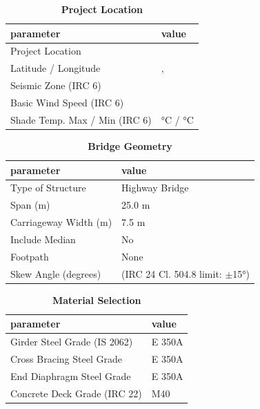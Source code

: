 \documentclass[12pt,a4paper]{report}
\numberwithin{table}{chapter}
\numberwithin{figure}{chapter}
\begin{document}
\begin{table}[H]
\caption{\textbf{Project Location}}
\label{subsec:project-location}
\begin{tabular}{|L{5.5cm}|L{8.5cm}|}
\hline
\textbf{parameter} & \textbf{value} \\
\hline
\textnormal{Project Location} &  \\
\hline
\textnormal{Latitude / Longitude} & ,  \\
\hline
\textnormal{Seismic Zone (IRC 6)} &  \\
\hline
\textnormal{Basic Wind Speed (IRC 6)} &  \\
\hline
\textnormal{Shade Temp. Max / Min (IRC 6)} &  °C /  °C \\
\hline
\end{tabular}
\vspace{0.4cm}
\end{table}

\begin{table}[H]
\caption{\textbf{Bridge Geometry}}
\label{subsec:bridge-geometry}
\begin{tabular}{|L{5.5cm}|L{8.5cm}|}
\hline
\textbf{parameter} & \textbf{value} \\
\hline
\textnormal{Type of Structure} & Highway Bridge \\
\hline
\textnormal{Span (m)} & 25.0 m \\
\hline
\textnormal{Carriageway Width (m)} & 7.5 m \\
\hline
\textnormal{Include Median} & No \\
\hline
\textnormal{Footpath} & None \\
\hline
\textnormal{Skew Angle (degrees)} &  (IRC 24 Cl. 504.8 limit: $\pm$15°) \\
\hline
\end{tabular}
\end{table}
\vspace{0.4cm}

\begin{table}[H]
\caption{\textbf{Material Selection}}
\label{subsec:material}
\begin{tabular}{|L{5.5cm}|L{8.5cm}|}
\hline
\textbf{parameter} & \textbf{value} \\
\hline
\textnormal{Girder Steel Grade (IS 2062)} & E 350A \\
\hline
\textnormal{Cross Bracing Steel Grade} & E 350A \\
\hline
\textnormal{End Diaphragm Steel Grade} & E 350A \\
\hline
\textnormal{Concrete Deck Grade (IRC 22)} & M40 \\
\hline
\end{tabular}
\end{table}
\vspace{0.4cm}
\end{document}
